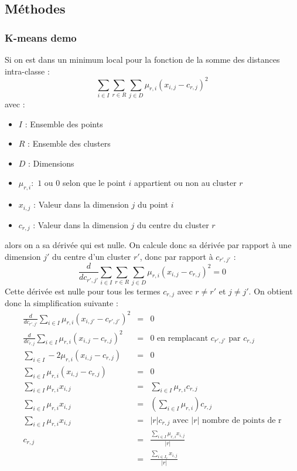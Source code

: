 \subsection{Méthodes}
\subsubsection{K-means demo}
Si on est dans un minimum local pour la fonction de la somme des distances intra-classe :
\[ \sum_{i\in I} \sum_{r\in R} \sum_{j\in D}\mu_{r,i} (x_{i,j}-c_{r,j})^2\]
avec :
\begin{itemize}
    \item $I$ : Ensemble des points
    \item $R$ : Ensemble des clusters
    \item $D$ : Dimensions
    \item $\mu_{r,i} :$ $1$ ou $0$ selon que le point $i$ appartient ou non au cluster $r$
    \item $x_{i,j}$ : Valeur dans la dimension $j$ du point $i$
    \item $c_{r,j}$ : Valeur dans la dimension $j$ du centre du cluster $r$
\end{itemize}
alors on a sa dérivée qui est nulle. On calcule donc sa dérivée par rapport à une dimension $j'$ du centre d'un cluster $r'$, donc par rapport à $c_{r',j'}$ :
\[
    \frac{d}{dc_{r',j'}}\sum_{i\in I} \sum_{r\in R} \sum_{j\in D}\mu_{r,i} (x_{i,j}-c_{r,j})^2 = 0
\]
Cette dérivée est nulle pour tous les termes $c_{r,j}$ avec $r\neq r'$ et $j\neq j'$. On obtient donc la simplification suivante :
\begin{eqnarray*}
    \frac{d}{dc_{r',j'}}\sum_{i\in I} \mu_{r,i} (x_{i,j'}-c_{r',j'})^2 &=& 0\\
    \frac{d}{dc_{r,j}}\sum_{i\in I} \mu_{r,i} (x_{i,j}-c_{r,j})^2 &=& 0  \text{ en remplacant $c_{r',j'}$ par $c_{r,j}$}\\
    \sum_{i\in I}-2\mu_{r,i}(x_{i,j}-c_{r,j}) &=& 0\\
    \sum_{i\in I}\mu_{r,i}(x_{i,j}-c_{r,j}) &=& 0\\
    \sum_{i\in I}\mu_{r,i}x_{i,j} &=& \sum_{i\in I}\mu_{r,i}c_{r,j}\\
    \sum_{i\in I}\mu_{r,i}x_{i,j} &=& (\sum_{i\in I}\mu_{r,i})c_{r,j}\\
    \sum_{i\in I}\mu_{r,i}x_{i,j} &=& |r|c_{r,j} \text{ avec $|r|$ nombre de points de r}\\
    c_{r,j} &=& \frac{\sum_{i\in I}\mu_{r,i}x_{i,j}}{|r|}\\
    &=& \frac{\sum_{i\in I_r}x_{i,j}}{|r|}
\end{eqnarray*}

